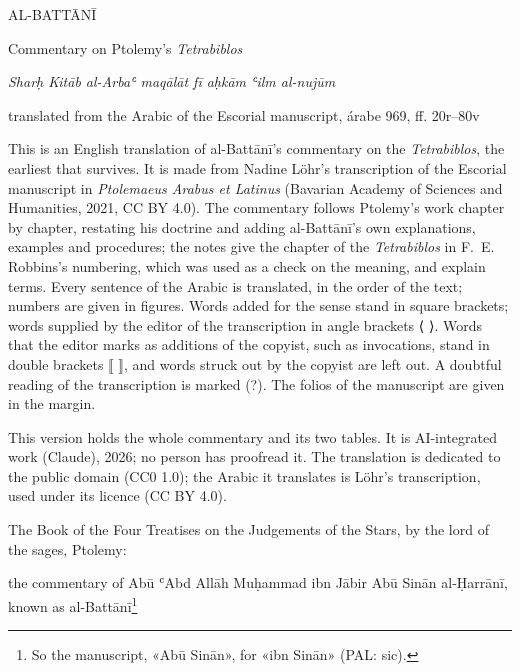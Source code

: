 \documentclass[11pt]{article}
\newcommand{\Fol}[1]{\marginpar{\footnotesize\color{gray}f.\,#1}}
\begin{document}
\thispagestyle{empty}
\begin{center}\Large AL-BATTĀNĪ\par\vspace{4mm}\LARGE Commentary on Ptolemy's \emph{Tetrabiblos}\par\vspace{2mm}\large \emph{Sharḥ Kitāb al-Arbaʿ maqālāt fī aḥkām ʿilm al-nujūm}\par\vspace{5mm}\normalsize translated from the Arabic of the Escorial manuscript, árabe 969, ff. 20r–80v\end{center}\vspace{8mm}
\noindent This is an English translation of al-Battānī's commentary on the \emph{Tetrabiblos}, the earliest that survives. It is made from Nadine Löhr's transcription of the Escorial manuscript in \emph{Ptolemaeus Arabus et Latinus} (Bavarian Academy of Sciences and Humanities, 2021, CC BY 4.0). The commentary follows Ptolemy's work chapter by chapter, restating his doctrine and adding al-Battānī's own explanations, examples and procedures; the notes give the chapter of the \emph{Tetrabiblos} in F.~E. Robbins's numbering, which was used as a check on the meaning, and explain terms. Every sentence of the Arabic is translated, in the order of the text; numbers are given in figures. Words added for the sense stand in square brackets; words supplied by the editor of the transcription in angle brackets ⟨ ⟩. Words that the editor marks as additions of the copyist, such as invocations, stand in double brackets ⟦ ⟧, and words struck out by the copyist are left out. A doubtful reading of the transcription is marked (?). The folios of the manuscript are given in the margin.
\par\smallskip\noindent This version holds the whole commentary and its two tables. It is AI-integrated work (Claude), 2026; no person has proofread it. The translation is dedicated to the public domain (CC0 1.0); the Arabic it translates is Löhr's transcription, used under its licence (CC BY 4.0).
\par\clearpage
\begin{center}\Fol{20r}The Book of the Four Treatises on the Judgements of the Stars, by the lord of the sages, Ptolemy:\end{center}
\begin{center}the commentary of Abū ʿAbd Allāh Muḥammad ibn Jābir Abū Sinān al-Ḥarrānī, known as al-Battānī\footnote{So the manuscript, «Abū Sinān», for «ibn Sinān» (PAL: sic).}\end{center}
\end{document}
